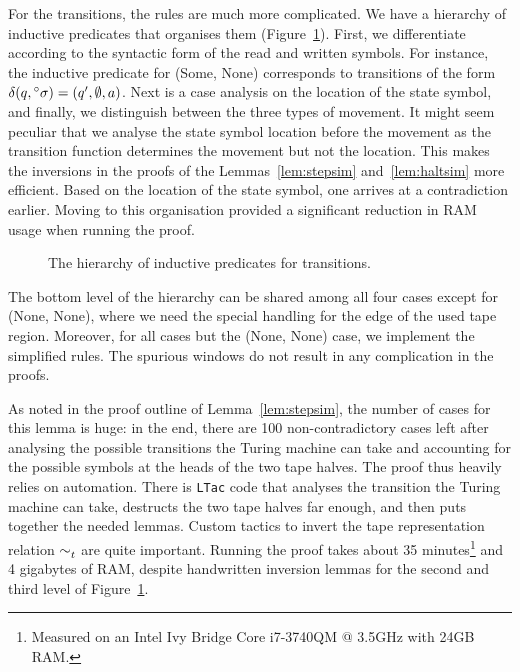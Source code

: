 For the transitions, the rules are much more complicated. We have a hierarchy of inductive predicates that organises them (Figure~\ref{fig:orga_rules}). First, we differentiate according to the syntactic form of the read and written symbols. For instance, the inductive predicate for (Some, None) corresponds to transitions of the form $\delta (q, \prescript{\circ}{}\sigma) = (q', \emptyset, a)$. 
Next is a case analysis on the location of the state symbol, and finally, we distinguish between the three types of movement.
It might seem peculiar that we analyse the state symbol location before the movement as the transition function determines the movement but not the location. This makes the inversions in the proofs of the Lemmas~\ref{lem:stepsim} and~\ref{lem:haltsim} more efficient. Based on the location of the state symbol, one arrives at a contradiction earlier. Moving to this organisation provided a significant reduction in RAM usage when running the proof. 
\begin{figure}
  \begin{center}
  \end{center}
  \caption{The hierarchy of inductive predicates for transitions.}\label{fig:orga_rules}
\end{figure}

The bottom level of the hierarchy can be shared among all four cases except for (None, None), where we need the special handling for the edge of the used tape region. Moreover, for all cases but the (None, None) case, we implement the simplified rules. The spurious windows do not result in any complication in the proofs.

As noted in the proof outline of Lemma~\ref{lem:stepsim}, the number of cases for this lemma is huge: in the end, there are 100 non-contradictory cases left after analysing the possible transitions the Turing machine can take and accounting for the possible symbols at the heads of the two tape halves. The proof thus heavily relies on automation. There is \texttt{LTac} code that analyses the transition the Turing machine can take, destructs the two tape halves far enough, and then puts together the needed lemmas. Custom tactics to invert the tape representation relation $\sim_t^{}$ are quite important.
Running the proof takes about 35 minutes\footnote{Measured on an Intel Ivy Bridge Core i7-3740QM @ 3.5GHz with 24GB RAM.} and 4 gigabytes of RAM, despite handwritten inversion lemmas for the second and third level of Figure~\ref{fig:orga_rules}. 

